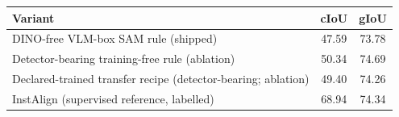 \begin{tabular}{lcc}
\toprule
Variant & cIoU & gIoU \\
\midrule
DINO-free VLM-box SAM rule (shipped) & 47.59 & 73.78 \\
Detector-bearing training-free rule (ablation) & 50.34 & 74.69 \\
Declared-trained transfer recipe (detector-bearing; ablation) & 49.40 & 74.26 \\
\midrule
InstAlign (supervised reference, labelled) & 68.94 & 74.34 \\
\bottomrule
\end{tabular}
